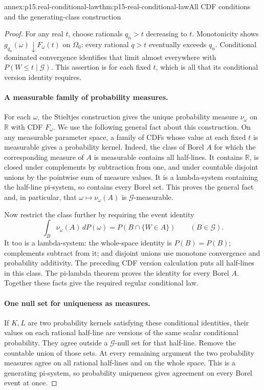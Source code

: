 \begin{annexitem}{annex:p15.real-conditional-law}{thm:p15-real-conditional-law}{All CDF conditions and the generating-class construction}
\begin{proof}
For any real \(t\), choose rationals \(q_n>t\) decreasing to \(t\).
Monotonicity shows \(g_{q_n}(\omega)\downarrow F_\omega(t)\)
on \(\Omega_0\): every rational \(q>t\) eventually exceeds \(q_n\).
Conditional dominated convergence identifies that limit almost
everywhere with \(P(W\leq t\mid\mathcal G)\).
This assertion is for each fixed \(t\), which is all that its
conditional version identity requires.

\paragraph{A measurable family of probability measures.}
For each \(\omega\), the Stieltjes construction gives the unique
probability measure \(\nu_\omega\) on \(\mathbb R\) with CDF \(F_\omega\).
We use the following general fact about this construction.
On any measurable parameter space, a family of CDFs whose value at
each fixed \(t\) is measurable gives a probability kernel.
Indeed, the class of Borel \(A\) for which the corresponding
measure of \(A\) is measurable contains all half-lines.
It contains \(\mathbb R\), is closed under complements by subtraction
from one, and under countable disjoint unions by the pointwise
sum of measure values. It is a lambda-system containing the
half-line pi-system, so contains every Borel set.
This proves the general fact and, in particular, that
\(\omega\mapsto\nu_\omega(A)\) is \(\mathcal G\)-measurable.

Now restrict the class further by requiring the event identity
\[
                   \int_B\nu_\omega(A)\,dP(\omega)
                                 =P(B\cap\{W\in A\})
                                       \qquad(B\in\mathcal G).
\]
It too is a lambda-system: the whole-space identity is \(P(B)=P(B)\);
complements subtract from it; and disjoint unions use monotone
convergence and probability additivity.
The preceding CDF version calculation puts all half-lines in this
class. The pi-lambda theorem proves the identity for every Borel \(A\).
Together these facts give the required regular conditional law.

\paragraph{One null set for uniqueness as measures.}
If \(K,L\) are two probability kernels satisfying these conditional
identities, their values on each rational half-line are versions of
the same scalar conditional probability. They agree outside a
\(\mathcal G\)-null set for that half-line.
Remove the countable union of those sets. At every remaining
argument the two probability measures agree on all rational half-lines
and on the whole space. This is a generating pi-system, so probability
uniqueness gives agreement on every Borel event at once.
\end{proof}
\end{annexitem}

